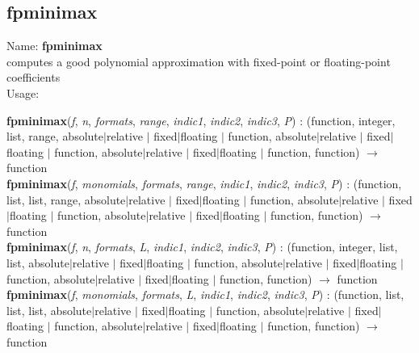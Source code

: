 \subsection{fpminimax}
\label{labfpminimax}
\noindent Name: \textbf{fpminimax}\\
computes a good polynomial approximation with fixed-point or floating-point coefficients\\

\noindent Usage: 
\begin{center}
\textbf{fpminimax}(\emph{f}, \emph{n}, \emph{formats}, \emph{range}, \emph{indic1}, \emph{indic2}, \emph{indic3}, \emph{P}) : (\textsf{function}, \textsf{integer}, \textsf{list}, \textsf{range}, \textsf{absolute$|$relative} $|$ \textsf{fixed$|$floating} $|$ \textsf{function}, \textsf{absolute$|$relative} $|$ \textsf{fixed$|$floating} $|$ \textsf{function}, \textsf{absolute$|$relative} $|$ \textsf{fixed$|$floating} $|$ \textsf{function}, \textsf{function}) $\rightarrow$ \textsf{function}\\
\textbf{fpminimax}(\emph{f}, \emph{monomials}, \emph{formats}, \emph{range}, \emph{indic1}, \emph{indic2}, \emph{indic3}, \emph{P}) : (\textsf{function}, \textsf{list}, \textsf{list}, \textsf{range}, \textsf{absolute$|$relative} $|$ \textsf{fixed$|$floating} $|$ \textsf{function}, \textsf{absolute$|$relative} $|$ \textsf{fixed$|$floating} $|$ \textsf{function}, \textsf{absolute$|$relative} $|$ \textsf{fixed$|$floating} $|$ \textsf{function}, \textsf{function}) $\rightarrow$ \textsf{function}\\
\textbf{fpminimax}(\emph{f}, \emph{n}, \emph{formats}, \emph{L}, \emph{indic1}, \emph{indic2}, \emph{indic3}, \emph{P}) : (\textsf{function}, \textsf{integer}, \textsf{list}, \textsf{list}, \textsf{absolute$|$relative} $|$ \textsf{fixed$|$floating} $|$ \textsf{function}, \textsf{absolute$|$relative} $|$ \textsf{fixed$|$floating} $|$ \textsf{function}, \textsf{absolute$|$relative} $|$ \textsf{fixed$|$floating} $|$ \textsf{function}, \textsf{function}) $\rightarrow$ \textsf{function}\\
\textbf{fpminimax}(\emph{f}, \emph{monomials}, \emph{formats}, \emph{L}, \emph{indic1}, \emph{indic2}, \emph{indic3}, \emph{P}) : (\textsf{function}, \textsf{list}, \textsf{list}, \textsf{list}, \textsf{absolute$|$relative} $|$ \textsf{fixed$|$floating} $|$ \textsf{function}, \textsf{absolute$|$relative} $|$ \textsf{fixed$|$floating} $|$ \textsf{function}, \textsf{absolute$|$relative} $|$ \textsf{fixed$|$floating} $|$ \textsf{function}, \textsf{function}) $\rightarrow$ \textsf{function}\\
\end{center}
